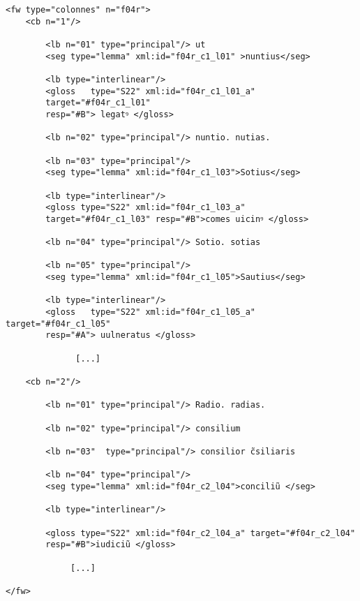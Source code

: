 \documentclass[a4paper, twoside, 12pt]{book}
\begin{document}
\begin{verbatim} 
<fw type="colonnes" n="f04r">
    <cb n="1"/>
                              
        <lb n="01" type="principal"/> ut 
        <seg type="lemma" xml:id="f04r_c1_l01" >nuntius</seg>
                              
        <lb type="interlinear"/>
        <gloss   type="S22" xml:id="f04r_c1_l01_a" 
        target="#f04r_c1_l01" 
        resp="#B"> legatꝰ </gloss> 
                              
        <lb n="02" type="principal"/> nuntio. nutias. 
               
        <lb n="03" type="principal"/> 
        <seg type="lemma" xml:id="f04r_c1_l03">Sotius</seg>
                              
        <lb type="interlinear"/>
        <gloss type="S22" xml:id="f04r_c1_l03_a" 
        target="#f04r_c1_l03" resp="#B">comes uicinꝰ </gloss>
                              
        <lb n="04" type="principal"/> Sotio. sotias 
                              
        <lb n="05" type="principal"/>
        <seg type="lemma" xml:id="f04r_c1_l05">Sautius</seg>
                              
        <lb type="interlinear"/>
        <gloss   type="S22" xml:id="f04r_c1_l05_a" target="#f04r_c1_l05"
        resp="#Α"> uulneratus </gloss>
                              
              [...]
              
    <cb n="2"/>
        
        <lb n="01" type="principal"/> Radio. radias.
                                    
        <lb n="02" type="principal"/> consilium 
                                    
        <lb n="03"  type="principal"/> consilior c̃siliaris
                                    
        <lb n="04" type="principal"/>
        <seg type="lemma" xml:id="f04r_c2_l04">conciliũ </seg>
                              
        <lb type="interlinear"/>
            
        <gloss type="S22" xml:id="f04r_c2_l04_a" target="#f04r_c2_l04"
        resp="#B">iudiciũ </gloss> 
            
             [...]
            
</fw>

\end{verbatim}
\end{document}
